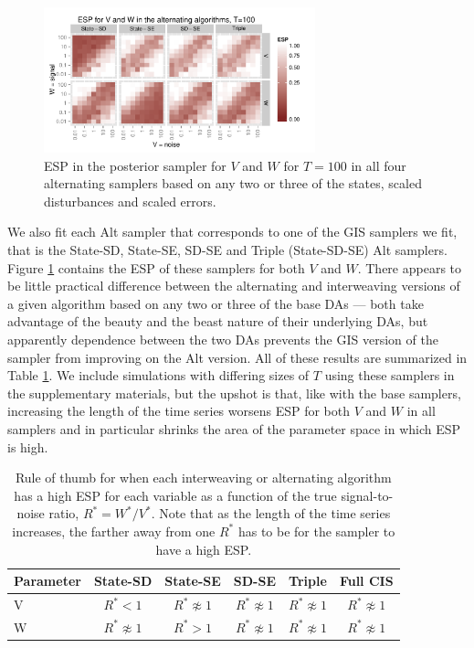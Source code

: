 \documentclass{article}
\begin{document}
\begin{figure}[!ht]
\centering
\includegraphics[width=0.7\textwidth]{altESplot100}
\caption{ESP in the posterior sampler for $V$ and $W$ for $T=100$ in all four alternating samplers based on any two or three of the states, scaled disturbances and scaled errors.}
\label{altESplot}
\end{figure}


We also fit each Alt sampler that corresponds to one of the GIS samplers we fit, that is the State-SD, State-SE, SD-SE and Triple (State-SD-SE) Alt samplers. Figure \ref{altESplot} contains the ESP of these samplers for both $V$ and $W$. There appears to be little practical difference between the alternating and interweaving versions of a given algorithm based on any two or three of the base DAs --- both take advantage of the beauty and the beast nature of their underlying DAs, but apparently dependence between the two DAs prevents the GIS version of the sampler from improving on the Alt version. All of these results are summarized in Table \ref{tab:stnmix2}. We include simulations with differing sizes of $T$ using these samplers in the supplementary materials, but the upshot is that, like with the base samplers, increasing the length of the time series worsens ESP for both $V$ and $W$ in all samplers and in particular shrinks the area of the parameter space in which ESP is high.

\begin{table}
  \centering
  \begin{tabular}{|l|ccccc|}\hline
    Parameter & State-SD        & State-SE       & SD-SE        & Triple            & Full CIS \\\hline
    V         & $R^* < 1$           & $R^* \not\approx 1$ & $R^* \not\approx 1$ & $R^* \not\approx 1$ & $R^* \not\approx 1$ \\
    W         & $R^* \not\approx 1$ & $R^* > 1$           & $R^* \not\approx 1$ & $R^* \not\approx 1$ & $R^* \not\approx 1$\\\hline
  \end{tabular}
  \caption{Rule of thumb for when each interweaving or alternating algorithm has a high ESP for each variable as a function of the true signal-to-noise ratio, $R^*=W^*/V^*$. Note that as the length of the time series increases, the farther away from one $R^*$ has to be for the sampler to have a high ESP.}
  \label{tab:stnmix2}
\end{table}
\end{document}
